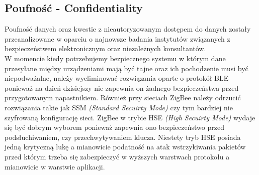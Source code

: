 \subsection{Poufność - Confidentiality}
\par
\tab Poufność danych oraz kwestie z nieautoryzowanym dostępem do danych zostały przeanalizowane w oparciu o najnowsze badania instytutów związanych z bezpieczeństwem elektronicznym oraz niezależnych konsultantów. \\
W momencie kiedy potrzebujemy bezpiecznego systemu w którym dane przesyłane między urządzeniami mają być tajne oraz ich pochodzenie musi być niepodważalne, należy wyeliminować rozwiązania oparte o protokół BLE ponieważ na dzień dzisiejszy nie zapewnia on żadnego bezpieczeństwa przed przygotowanym napastnikiem. Również przy sieciach ZigBee należy odrzucić rozwiązania takie jak SSM \textit{(Standard Secuirty Mode)} czy tym bardziej nie szyfrowaną konfigurację sieci. ZigBee w trybie HSE \textit{(High Secuirty Mode)} wydaje się być dobrym wyborem ponieważ zapewnia ono bezpieczeństwo przed podsłuchiwaniem, czy przechwytywaniem klucza. Niestety tryb HSE posiada jedną krytyczną lukę a mianowicie podatność na atak wstrzykiwania pakietów przed którym trzeba się zabezpieczyć w wyższych warstwach protokołu a mianowicie w warstwie aplikacji. \\

